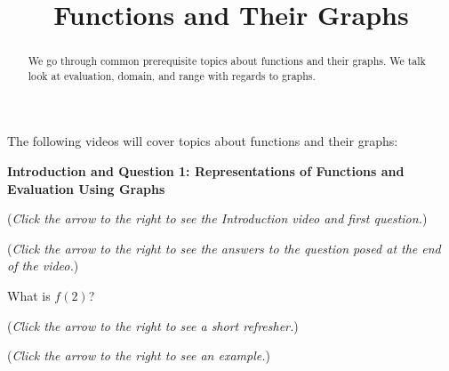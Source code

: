 \documentclass{ximera}
\title[Prerequisite Videos: ]{Functions and Their Graphs}
\begin{document}
\begin{abstract}
  We go through common prerequisite topics about functions and their graphs. 
  We talk look at evaluation, domain, and range with regards to graphs.
\end{abstract}
\maketitle

The following videos will cover topics about functions and their graphs:

\textbf{Introduction and Question 1: Representations of 
Functions and Evaluation Using Graphs}
\begin{question}
\begin{flushright}
{\color{blue}(\emph{Click the arrow to the right to see the Introduction video and first question.})}
\end{flushright}
\begin{center}
\begin{expandable}
{\color{blue}(\emph{Click the arrow to the right to see the answers 
to the question posed at the end of the video.})}
\begin{expandable}
What is $f(2)$?
\begin{multipleChoice}
\end{multipleChoice}
\begin{flushright}
{\color{blue}(\emph{Click the arrow to the right to see a short refresher.})}
\end{flushright}
\begin{expandable}
\end{expandable}
\begin{flushright}
{\color{blue}(\emph{Click the arrow to the right to see an example.})}
\end{flushright}
\begin{expandable}
\end{expandable}
\end{expandable}
\end{expandable}
\end{center}
\end{question}
\end{document}
